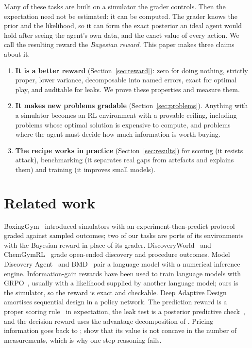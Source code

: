 \documentclass[10pt]{article}
\theoremstyle{definition}
\theoremstyle{remark}
\theoremstyle{plain}
\begin{document}
Many of these tasks are built on a simulator the grader controls. Then the expectation need not
be estimated: it can be computed. The grader knows the prior and the likelihood, so it can form
the exact posterior an ideal agent would hold after seeing the agent's own data, and the exact
value of every action. We call the resulting reward the \emph{Bayesian reward}. This paper makes
three claims about it.
\begin{enumerate}
\item \textbf{It is a better reward} (Section~\ref{sec:reward}): zero for doing nothing,
strictly proper, lower variance, decomposable into named errors, exact for optimal play, and
auditable for leaks. We prove these properties and measure them.
\item \textbf{It makes new problems gradable} (Section~\ref{sec:problems}). Anything with a
simulator becomes an RL environment with a provable ceiling, including problems whose optimal
solution is expensive to compute, and problems where the agent must decide how much information
is worth buying.
\item \textbf{The recipe works in practice} (Section~\ref{sec:results}) for scoring
(it resists attack), benchmarking (it separates real gaps from artefacts and explains them) and
training (it improves small models).
\end{enumerate}

\section{Related work}

BoxingGym~\citep{gandhi2025boxinggym} introduced simulators with an experiment-then-predict
protocol graded against sampled outcomes; two of our tasks are ports of its environments with
the Bayesian reward in place of its grader. DiscoveryWorld~\citep{jansen2024discoveryworld} and
ChemGymRL~\citep{beeler2023chemgymrl} grade open-ended discovery and procedure outcomes. Model
Discovery Agent~\citep{murphy2026mda} and BMD~\citep{yuh2026bmd} pair a language model with a
numerical inference engine. Information-gain rewards have been used to train language models
with GRPO~\citep{shao2024deepseekmath,kriz2026amortizing,verma2026igft,li2026cigask}, usually with
a likelihood supplied by another language model; ours is the simulator, so the reward is exact
and checkable. Deep Adaptive Design~\citep{foster2021dad} amortises sequential design in a
policy network. The prediction reward is a proper scoring rule~\citep{gneiting2007strictly} in
expectation, the leak test is a posterior predictive check~\citep{gelman1996posterior}, and the
decision reward uses the advantage decomposition of \citet{kakade2002approximately}. Pricing
information goes back to \citet{howard1966information}; \citet{frazier2010paradoxes} show that
its value is not concave in the number of measurements, which is why one-step reasoning fails.
\end{document}
